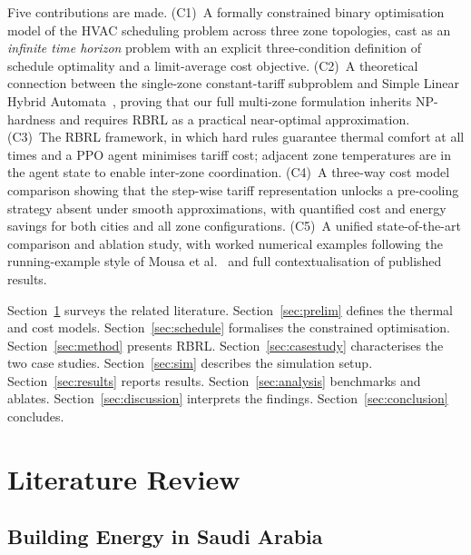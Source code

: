 \documentclass[12pt,a4paper]{article}
\let\oldsection\section
\renewcommand{\section}[1]{\FloatBarrier\oldsection{#1}}
\let\oldsubsection\subsection
\renewcommand{\subsection}[1]{\FloatBarrier\oldsubsection{#1}}
\begin{document}
Five contributions are made.
(C1)~A formally constrained binary optimisation model of the HVAC
scheduling problem across three zone topologies, cast as an
\emph{infinite time horizon} problem with an explicit three-condition
definition of schedule optimality and a limit-average cost objective.
(C2)~A theoretical connection between the single-zone constant-tariff
subproblem and Simple Linear Hybrid Automata~\cite{Mousa2018}, proving
that our full multi-zone formulation inherits NP-hardness and requires
RBRL as a practical near-optimal approximation.
(C3)~The RBRL framework, in which hard rules guarantee thermal comfort
at all times and a PPO agent minimises tariff cost; adjacent zone
temperatures are in the agent state to enable inter-zone coordination.
(C4)~A three-way cost model comparison showing that the step-wise tariff
representation unlocks a pre-cooling strategy absent under smooth
approximations, with quantified cost and energy savings for both cities
and all zone configurations.
(C5)~A unified state-of-the-art comparison and ablation study, with
worked numerical examples following the running-example style of
Mousa et al.~\cite{Mousa2018} and full contextualisation of published results.

Section~\ref{sec:litreview} surveys the related literature.
Section~\ref{sec:prelim} defines the thermal and cost models.
Section~\ref{sec:schedule} formalises the constrained optimisation.
Section~\ref{sec:method} presents RBRL.
Section~\ref{sec:casestudy} characterises the two case studies.
Section~\ref{sec:sim} describes the simulation setup.
Section~\ref{sec:results} reports results.
Section~\ref{sec:analysis} benchmarks and ablates.
Section~\ref{sec:discussion} interprets the findings.
Section~\ref{sec:conclusion} concludes.

\section{Literature Review}
\label{sec:litreview}

\subsection{Building Energy in Saudi Arabia}
\end{document}
